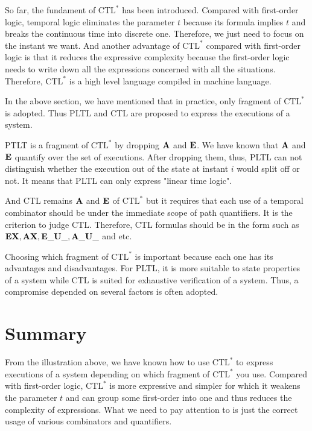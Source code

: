 \documentclass[11pt, conference]{IEEEtran}
\begin{document}
    So far, the fundament of $\text{CTL}^*$ has been introduced. Compared with first-order logic, temporal logic eliminates the parameter $t$ because its formula implies $t$ and breaks the continuous time into discrete one. Therefore, we just need to focus on the instant we want. And another advantage of $\text{CTL}^*$ compared with first-order logic is that it reduces the expressive complexity because the first-order logic needs to write down all the expressions concerned with all the situations. Therefore, $\text{CTL}^*$ is a high level language compiled in machine language. 
    
    In the above section, we have mentioned that in practice, only fragment of $ \text{CTL}^*$ is adopted. Thus PLTL and CTL are proposed to express the executions of a system.
    
    PTLT is a fragment of $\text{CTL}^*$ by dropping $\text{\textbf{A}}$ and $\text{\textbf{E}}$. We have known that $\text{\textbf{A}}$ and $\text{\textbf{E}}$ quantify over the set of executions. After dropping them, thus, PLTL can not distinguish whether the execution out of the state at instant $i$ would split off or not. It means that PLTL can only express "linear time logic".
    
    And CTL remains $\text{\textbf{A}}$ and $\text{\textbf{E}}$ of $\text{CTL}^*$ but it requires that each use of a temporal combinator should be under the immediate scope of path quantifiers. It is the criterion to judge CTL. Therefore, CTL formulas should be in the form such as  $\text{\textbf{E}}\text{\textbf{X}},\text{\textbf{A}}\text{\textbf{X}},\text{\textbf{E}}\_\text{\textbf{U}} \_,\text{\textbf{A}}\_\text{\textbf{U}} \_$ and etc.
    
    Choosing which fragment of $\text{CTL}^*$ is important because each one has its advantages and disadvantages. For PLTL, it is more suitable to state properties of a system while CTL is suited for exhaustive verification of a system. Thus, a compromise depended on several factors is often adopted.
    
    \section{Summary}
    From the illustration above, we have known how to use $\text{CTL}^*$ to express executions of a system depending on which fragment of $\text{CTL}^*$ you use. Compared with first-order logic, $\text{CTL}^*$ is more expressive and simpler for which it weakens the parameter $t$ and can group some first-order into one and thus reduces the complexity of expressions. What we need to pay attention to is just the correct usage of various combinators and quantifiers.
\end{document}
